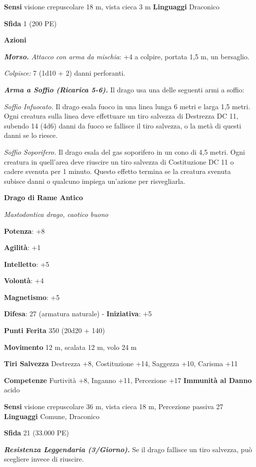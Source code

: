 \begin{multicols}{2}
\textbf{Sensi} visione crepuscolare 18 m, vista cieca 3 m
\textbf{Linguaggi} Draconico

\textbf{Sfida} 1 (200 PE)

\textbf{Azioni}

\emph{\textbf{Morso.} Attacco con arma da mischia}: +4 a colpire,
portata 1,5 m, un bersaglio.

\emph{Colpisce:} 7 (1d10 + 2) danni perforanti.

\emph{\textbf{Arma a Soffio (Ricarica 5-6).}} Il drago usa una delle
seguenti armi a soffio:

\emph{Soffio Infuocato.} Il drago esala fuoco in una linea lunga 6 metri
e larga 1,5 metri. Ogni creatura sulla linea deve effettuare un tiro
salvezza di Destrezza DC 11, subendo 14 (4d6) danni da fuoco se fallisce
il tiro salvezza, o la metà di questi danni se lo riesce.

\emph{Soffio Soporifero.} Il drago esala del gas soporifero in un cono
di 4,5 metri. Ogni creatura in quell'area deve riuscire un tiro salvezza
di Costituzione DC 11 o cadere svenuta per 1 minuto. Questo effetto
termina se la creatura svenuta subisce danni o qualcuno impiega
un'azione per risvegliarla.

\textbf{Drago di Rame Antico}

\emph{Mastodontica drago, caotico buono}

\textbf{Potenza}: +8

\textbf{Agilità}: +1

\textbf{Intelletto}: +5

\textbf{Volontà}: +4

\textbf{Magnetismo}: +5

\textbf{Difesa}: 27 (armatura naturale) - \textbf{Iniziativa}: +5

\textbf{Punti Ferita} 350 (20d20 + 140)

\textbf{Movimento} 12 m, scalata 12 m, volo 24 m

\textbf{Tiri Salvezza} Destrezza +8, Costituzione +14, Saggezza +10,
Carisma +11

\textbf{Competenze} Furtività +8, Inganno +11, Percezione +17
\textbf{Immunità al Danno} acido

\textbf{Sensi} visione crepuscolare 36 m, vista cieca 18 m, Percezione passiva
27 \textbf{Linguaggi} Comune, Draconico

\textbf{Sfida} 21 (33.000 PE)

\emph{\textbf{Resistenza Leggendaria (3/Giorno).}} Se il drago fallisce
un tiro salvezza, può scegliere invece di riuscire.


\end{multicols}
